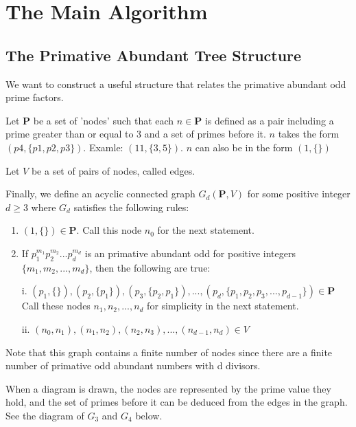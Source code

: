 \documentclass[../paper.tex]{subfiles}
\begin{document}
\section{The Main Algorithm}

\subsection{The Primative Abundant Tree Structure}

We want to construct a useful structure that relates the primative
abundant odd prime factors. 

Let $\mathbf{P}$ be a set of 'nodes' such that each $n \in 
\mathbf{P}$ is defined as a pair including a prime greater 
than or equal to 3 and a set of primes before it. $n$ takes the 
form $(p4, \{p1, p2, p3\})$. Examle: $(11, \{3, 5\})$.
$n$ can also be in the form $(1, \{\})$

Let $V$ be a set of pairs of nodes, called edges.

Finally, we define an acyclic connected graph $G_d(\mathbf{P},V)$ 
for some positive integer $d \geq 3$ where $G_d$ satisfies the 
following rules: 

\begin{enumerate}

\item $(1, \{\}) \in \mathbf{P}$. Call this node $n_0$ for the next 
      statement.

\item If $p_1^{m_1}p_2^{m_2}...p_d^{m_d}$ is an primative abundant 
      odd for positive integers $\{m_1, m_2, ..., m_d\}$, then
			the following are true: 

      i. $ (p_1, \{\}), (p_2, \{p_1\}), (p_3, \{p_2, p_1\}), ..., 
        (p_d, \{p_1, p_2, p_3, ..., p_{d-1}\}) \in \mathbf{P} $
			Call these nodes $n_1, n_2, ..., n_d$ for simplicity in the 
			next statement.

      ii. $ (n_0, n_1), (n_1, n_2), (n_2, n_3), ..., (n_{d-1}, n_{d}) 
      \in V $

\end{enumerate}

Note that this graph contains a finite number of nodes since 
there are a finite number of primative odd abundant numbers with
d divisors. 

When a diagram is drawn, the nodes are represented by the prime
value they hold, and the set of primes before it can be deduced
from the edges in the graph. See the diagram of $G_3$ and $G_4$
below.
\end{document}
